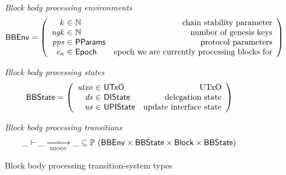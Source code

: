 \documentclass[11pt,a4paper]{article}
\newcommand{\powerset}[1]{\mathbb{P}~#1}
\newcommand{\var}[1]{\mathit{#1}}
\newcommand{\type}[1]{\mathsf{#1}}
\newcommand{\trans}[2]{\xlongrightarrow[\textsc{#1}]{#2}}
\newcommand{\Block}{\type{Block}}
\newcommand{\ProtParams}{\type{PParams}} %
\begin{document}
\begin{figure}[ht]
  \emph{Block body processing environments}
  \begin{equation*}
    \BBEnv =
    \left(
      \begin{array}{r@{~\in~}lr}
        k & \mathbb{N} & \text{chain stability parameter}\\
        \var{ngk} & \mathbb{N} & \text{number of genesis keys}\\
        \var{pps} & \ProtParams & \text{protocol parameters} \\
        \var{e_n} & \Epoch & \text{epoch we are currently processing blocks for}
      \end{array}
    \right)
  \end{equation*}

  \emph{Block body processing states}
  \begin{equation*}
    \BBState =
    \left(
      \begin{array}{r@{~\in~}lr}
        \var{utxo} & \UTxO & \text{UTxO} \\
        \var{ds} & \DIState & \text{delegation state} \\
        \var{us} & \UPIState & \text{update interface state}
      \end{array}
    \right)
  \end{equation*}

  \emph{Block body processing transitions}
  \begin{equation*}
    \_ \vdash \var{\_} \trans{bbody}{\_} \var{\_} \subseteq
    \powerset (\BBEnv \times \BBState \times \Block \times \BBState)
  \end{equation*}
  \caption{Block body processing transition-system types}
  \label{fig:ts-types:bbody}
\end{figure}
\end{document}
